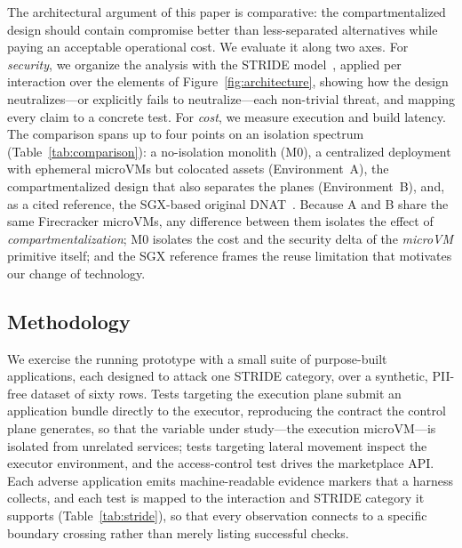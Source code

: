
The architectural argument of this paper is comparative: the compartmentalized design should
contain compromise better than less-separated alternatives while paying an acceptable
operational cost. We evaluate it along two axes. For \emph{security}, we organize the
analysis with the STRIDE model~\cite{shostack2014threat}, applied per interaction over the
elements of Figure~\ref{fig:architecture}, showing how the design neutralizes---or
explicitly fails to neutralize---each non-trivial threat, and mapping every claim to a
concrete test. For \emph{cost}, we measure execution and build latency. The comparison spans
up to four points on an isolation spectrum (Table~\ref{tab:comparison}): a no-isolation
monolith (M0), a centralized deployment with ephemeral microVMs but colocated assets
(Environment~A), the compartmentalized design that also separates the planes
(Environment~B), and, as a cited reference, the SGX-based original
DNAT~\cite{nascimento2020dnat}. Because A and B share the same Firecracker microVMs, any
difference between them isolates the effect of \emph{compartmentalization}; M0 isolates the
cost and the security delta of the \emph{microVM} primitive itself; and the SGX reference
frames the reuse limitation that motivates our change of technology.

\subsection{Methodology}

We exercise the running prototype with a small suite of purpose-built applications, each
designed to attack one STRIDE category, over a synthetic, PII-free dataset of sixty rows.
Tests targeting the execution plane submit an application bundle directly to the executor,
reproducing the contract the control plane generates, so that the variable under study---the
execution microVM---is isolated from unrelated services; tests targeting lateral movement
inspect the executor environment, and the access-control test drives the marketplace API.
Each adverse application emits machine-readable evidence markers that a harness collects,
and each test is mapped to the interaction and STRIDE category it supports
(Table~\ref{tab:stride}), so that every observation connects to a specific boundary
crossing rather than merely listing successful checks.

